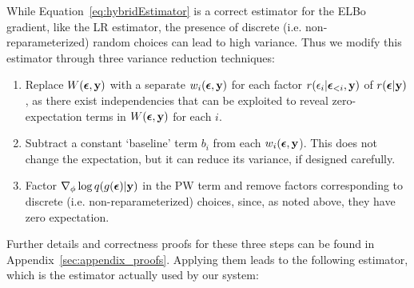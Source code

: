 While Equation~\ref{eq:hybridEstimator} is a correct estimator for the ELBo gradient, like the LR estimator, the presence of discrete (i.e. non-reparameterized) random choices can lead to high variance. Thus we modify this estimator through three variance reduction techniques:
\begin{enumerate}
\item{Replace $W(\bm{\epsilon}, \mathbf{y})$ with a separate $w_i(\bm{\epsilon}, \mathbf{y})$ for each factor $r(\epsilon_i | \bm{\epsilon}_{<i}, \mathbf{y})$ of $r(\bm{\epsilon} | \mathbf{y})$, as there exist independencies that can be exploited to reveal zero-expectation terms in $W(\bm{\epsilon}, \mathbf{y})$ for each $i$.}
\item{Subtract a constant `baseline' term $b_i$ from each $w_i(\bm{\epsilon}, \mathbf{y}$). This does not change the expectation, but it can reduce its variance, if designed carefully.}
\item{Factor $\nabla_\phi \log q(g(\bm{\epsilon}) | \mathbf{y})$ in the PW term and remove factors corresponding to discrete (i.e. non-reparameterized) choices, since, as noted above, they have zero expectation.}
\end{enumerate}
Further details and correctness proofs for these three steps can be found in Appendix~\ref{sec:appendix_proofs}. Applying them leads to the following estimator, which is the estimator actually used by our system:
